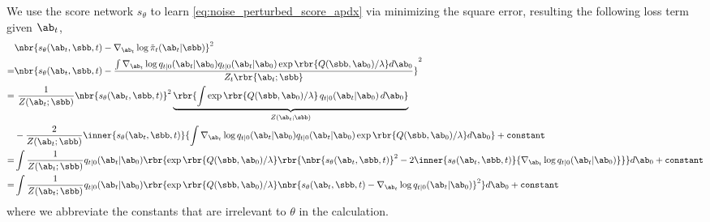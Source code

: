  We use the score network $s_\theta$ to learn \eqref{eq:noise_perturbed_score_apdx} via minimizing the square error, resulting the following loss term given $\ab_t$,
\begin{align}
    &\nbr{s_\theta(\ab_t,\sbb, t) -\nabla_{\ab_t}\log \tilde\pi_t(\ab_t|\sbb)}^2\notag\\ %
    =&\nbr{s_\theta(\ab_t,\sbb, t) -\frac{\int \nabla_{\ab_t}\log q_{t|0}(\ab_t|\ab_0) q_{t|0}(\ab_t|\ab_0)\exp\rbr{Q(\sbb,\ab_0)/\lambda} d\ab_0}{Z_t\rbr{\ab_t;\sbb}}}^2\notag\\ %
    = &~
    \frac{1}{Z(\ab_t;\sbb)}{\nbr{s_\theta(\ab_t,\sbb, t)}^2 \underbrace{\rbr{\int \exp\rbr{Q(\sbb,\ab_0)/\lambda}\,q_{t|0}(\ab_t|\ab_0)\,d\ab_0}}_{Z(\ab_t;\sbb)} }\notag \\
     & -
    \frac{2}{Z(\ab_t;\sbb)}{\inner{s_\theta(\ab_t,\sbb, t)}{\int \nabla_{\ab_t}\log q_{t|0}(\ab_t|\ab_0) q_{t|0}(\ab_t|\ab_0)\exp\rbr{Q(\sbb,\ab_0)/\lambda} d\ab_0}} + \texttt{constant}\label{eq:zx_apdx}\\
    = &
    \int\frac{1}{Z(\ab_t;\sbb)}q_{t|0}(\ab_t|\ab_0)\rbr{{\exp\rbr{Q(\sbb,\ab_0)/\lambda}}\rbr{\nbr{s_\theta(\ab_t,\sbb, t)}^2 - 2\inner{s_\theta(\ab_t,\sbb, t)}{\nabla_{\ab_t}\log q_{t|0}(\ab_t|\ab_0)} } }d\ab_0 + \texttt{constant} \notag \\
    = & \int\frac{1}{Z(\ab_t;\sbb)}q_{t|0}(\ab_t|\ab_0)\rbr{{\exp\rbr{Q(\sbb,\ab_0)/\lambda}}\nbr{s_\theta(\ab_t,\sbb, t) - \nabla_{\ab_t}\log q_{t|0}(\ab_t|\ab_0)}^2  } d\ab_0 + \texttt{constant} \label{eq:apdx_last_line_derive}
\end{align}
where we abbreviate the constants that are irrelevant to $\theta$ in the calculation.

